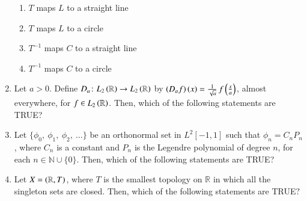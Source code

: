 \documentclass[journal,12pt,onecolumn]{IEEEtran}
\theoremstyle{remark}
\begin{document}
\begin{enumerate}
\hfill{}

\begin{enumerate}
\item $T$ maps $L$ to a straight line
\item $T$ maps $L$ to a circle
\item $T^{-1}$ maps $C$ to a straight line
\item $T^{-1}$ maps $C$ to a circle
\end{enumerate}
\newpage
\item Let $a>0$. Define $D_a \colon L_2\left(\mathbb{R}\right) \to L_2\left(\mathbb{R}\right)$ by $\left(D_a f\right)\left(x\right) = \frac{1}{\sqrt{a}}\,f\left(\frac{x}{a}\right)$, almost everywhere, for $f \in L_2\left(\mathbb{R}\right)$. Then, which of the following statements are TRUE?

\hfill{}

\begin{enumerate}
\end{enumerate}

\item Let $\{\phi_0,\ \phi_1,\ \phi_2,\ \dots\}$ be an orthonormal set in $L^2[-1,1]$ such that $\phi_n = C_n P_n$, where $C_n$ is a constant and $P_n$ is the Legendre polynomial of degree $n$, for each $n\in \mathbb{N}\cup\{0\}$. Then, which of the following statements are TRUE?

\hfill{}

\begin{enumerate}
\end{enumerate}

\item Let $X=\left(\mathbb{R},{T}\right)$, where ${T}$ is the smallest topology on $\mathbb{R}$ in which all the singleton sets are closed. Then, which of the following statements are TRUE$?$ 


\end{enumerate}
\end{document}
